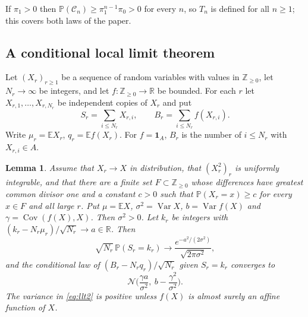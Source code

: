 \documentclass[11pt]{amsart}
\newtheorem{lemma}[theorem]{Lemma}
\theoremstyle{definition}
\newcommand{\R}{\mathbb{R}}
\newcommand{\Z}{\mathbb{Z}}
\newcommand{\E}{\mathbb{E}}
\newcommand{\Prob}{\mathbb{P}}
\newcommand{\Nor}{\mathcal{N}}
\newcommand{\Cond}{\mathcal{C}}
\newcommand{\Ind}{\mathbf{1}}
\DeclareMathOperator{\Var}{Var}
\DeclareMathOperator{\Cov}{Cov}
\begin{document}
If $\pi_1>0$ then $\Prob(\Cond_n)\ge\pi_1^{n-1}\pi_0>0$ for every $n$, so $T_n$ is defined for all $n\ge1$; this covers both laws of the paper.

\subsection{A conditional local limit theorem}

Let $(X_r)_{r\ge1}$ be a sequence of random variables with values in $\Z_{\ge0}$, let $N_r\to\infty$ be integers, and let $f:\Z_{\ge0}\to\R$ be bounded. For each $r$ let $X_{r,1},\dots,X_{r,N_r}$ be independent copies of $X_r$ and put
\[
S_r=\sum_{i\le N_r}X_{r,i},\qquad B_r=\sum_{i\le N_r}f(X_{r,i}).
\]
Write $\mu_r=\E X_r$, $q_r=\E f(X_r)$. For $f=\Ind_A$, $B_r$ is the number of $i\le N_r$ with $X_{r,i}\in A$.

\begin{lemma}\label{lem:llt}
Assume that $X_r\to X$ in distribution, that $(X_r^2)_r$ is uniformly integrable, and that there are a finite set $F\subset\Z_{\ge0}$ whose differences have greatest common divisor one and a constant $c>0$ such that $\Prob(X_r=x)\ge c$ for every $x\in F$ and all large $r$. Put $\mu=\E X$, $\sigma^2=\Var X$, $b=\Var f(X)$ and $\gamma=\Cov(f(X),X)$. Then $\sigma^2>0$. Let $k_r$ be integers with $(k_r-N_r\mu_r)/\sqrt{N_r}\to a\in\R$. Then
\begin{equation}\label{eq:llt1}
\sqrt{N_r}\,\Prob(S_r=k_r)\longrightarrow\frac{e^{-a^2/(2\sigma^2)}}{\sqrt{2\pi\sigma^2}},
\end{equation}
and the conditional law of $(B_r-N_rq_r)/\sqrt{N_r}$ given $S_r=k_r$ converges to
\begin{equation}\label{eq:llt2}
\Nor\Big(\frac{\gamma a}{\sigma^2},\ b-\frac{\gamma^2}{\sigma^2}\Big).
\end{equation}
The variance in \eqref{eq:llt2} is positive unless $f(X)$ is almost surely an affine function of $X$.
\end{lemma}
\end{document}

